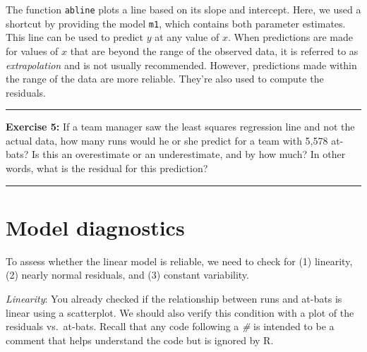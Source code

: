 \documentclass[]{book}
\newenvironment{Shaded}{\begin{snugshade}}{\end{snugshade}}
\newcommand{\CommentTok}[1]{\textcolor[rgb]{0.56,0.35,0.01}{\textit{#1}}}
\newcommand{\DataTypeTok}[1]{\textcolor[rgb]{0.13,0.29,0.53}{#1}}
\newcommand{\DecValTok}[1]{\textcolor[rgb]{0.00,0.00,0.81}{#1}}
\newcommand{\KeywordTok}[1]{\textcolor[rgb]{0.13,0.29,0.53}{\textbf{#1}}}
\newcommand{\NormalTok}[1]{#1}
\newcommand{\OperatorTok}[1]{\textcolor[rgb]{0.81,0.36,0.00}{\textbf{#1}}}
\newcommand{\StringTok}[1]{\textcolor[rgb]{0.31,0.60,0.02}{#1}}
\theoremstyle{definition}
\theoremstyle{definition}
\theoremstyle{definition}
\theoremstyle{remark}
\begin{document}
The function \texttt{abline} plots a line based on its slope and
intercept. Here, we used a shortcut by providing the model \texttt{m1},
which contains both parameter estimates. This line can be used to
predict \(y\) at any value of \(x\). When predictions are made for
values of \(x\) that are beyond the range of the observed data, it is
referred to as \emph{extrapolation} and is not usually recommended.
However, predictions made within the range of the data are more
reliable. They're also used to compute the residuals.

\begin{center}\rule{0.5\linewidth}{\linethickness}\end{center}

\textbf{Exercise 5:} If a team manager saw the least squares regression
line and not the actual data, how many runs would he or she predict for
a team with 5,578 at-bats? Is this an overestimate or an underestimate,
and by how much? In other words, what is the residual for this
prediction?

\begin{center}\rule{0.5\linewidth}{\linethickness}\end{center}

\hypertarget{model-diagnostics}{%
\section{Model diagnostics}\label{model-diagnostics}}

To assess whether the linear model is reliable, we need to check for (1)
linearity, (2) nearly normal residuals, and (3) constant variability.

\emph{Linearity}: You already checked if the relationship between runs
and at-bats is linear using a scatterplot. We should also verify this
condition with a plot of the residuals vs.~at-bats. Recall that any code
following a \emph{\#} is intended to be a comment that helps understand
the code but is ignored by R.

\begin{Shaded}
\end{Shaded}
\end{document}
